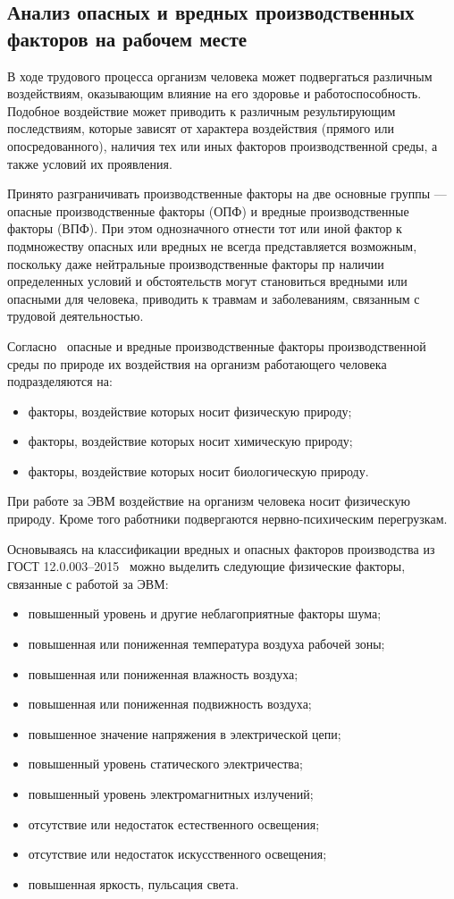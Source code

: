 \subsection{Анализ опасных и вредных производственных факторов на рабочем месте}

В ходе трудового процесса организм человека может подвергаться различным воздействиям, 
оказывающим влияние на его здоровье и работоспособность. Подобное воздействие может приводить к 
различным результирующим последствиям, которые зависят от характера воздействия (прямого или
опосредованного), наличия тех или иных факторов производственной среды, а также условий
их проявления. 

Принято разграничивать производственные факторы на две основные группы --- опасные производственные факторы
(ОПФ) и вредные производственные факторы (ВПФ). При этом однозначного отнести тот или иной
фактор к подмножеству опасных или вредных не всегда представляется возможным, поскольку
даже нейтральные производственные факторы пр наличии определенных условий и обстоятельств
могут становиться вредными или опасными для человека, приводить к травмам и заболеваниям, 
связанным с трудовой деятельностью.

Согласно~\cite{gost_12.0.003-2015} опасные и вредные производственные факторы производственной
среды по природе их воздействия на организм работающего человека подразделяются на:
\begin{itemize}
 \item факторы, воздействие которых носит физическую природу;
 \item факторы, воздействие которых носит химическую природу;
 \item факторы, воздействие которых носит биологическую природу.
\end{itemize}

При работе за ЭВМ воздействие на организм человека носит физическую природу. Кроме того
работники подвергаются нервно-психическим перегрузкам.

Основываясь на классификации вредных и опасных факторов производства из ГОСТ 12.0.003--2015~\cite{gost_12.0.003-2015} 
можно выделить следующие физические факторы, связанные с работой за ЭВМ:
\begin{itemize}
 \item повышенный уровень и другие неблагоприятные факторы шума;
 \item повышенная или пониженная температура воздуха рабочей зоны;
 \item повышенная или пониженная влажность воздуха;
 \item повышенная или пониженная подвижность воздуха;
 \item повышенное значение напряжения в электрической цепи;
 \item повышенный уровень статического электричества;
 \item повышенный уровень электромагнитных излучений;
 \item отсутствие или недостаток естественного освещения;
 \item отсутствие или недостаток искусственного освещения;
 \item повышенная яркость, пульсация света. 
\end{itemize}

